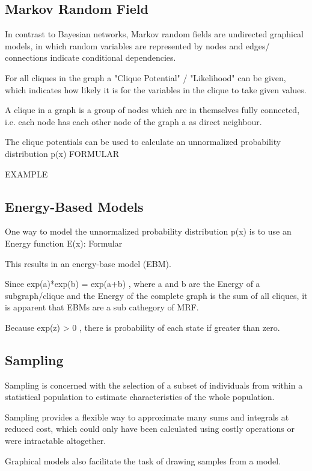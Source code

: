 \subsection{Markov Random Field}

In contrast to Bayesian networks, Markov random fields are undirected graphical models, in which random variables are represented by nodes and edges/ connections indicate conditional dependencies.

For all cliques in the graph a "Clique Potential" / "Likelihood" can be given, which indicates how likely it is for the variables in the clique to take given values.

A clique in a graph is a group of nodes which are in themselves fully connected, i.e. each node has each other node of the graph a as direct neighbour. 

The clique potentials can be used to calculate an unnormalized probability distribution p(x) FORMULAR

EXAMPLE

\subsection{Energy-Based Models}

One way to model the unnormalized probability distribution p(x) is to use an Energy function E(x): Formular

This results in an energy-base model (EBM). 

Since exp(a)*exp(b) = exp(a+b) , where a and b are the Energy of a subgraph/clique and the Energy of the complete graph is the sum of all cliques, it is apparent that EBMs are a sub cathegory of MRF.  

Because exp(z) > 0 , there is probability of each state if greater than zero. 

\subsection{Sampling}

Sampling is concerned with the selection of a subset of individuals from within a statistical population to estimate characteristics of the whole population.

Sampling provides a flexible way to approximate many sums and integrals at reduced cost, which could only have been calculated using costly operations or were intractable altogether.  

Graphical models also facilitate the task of drawing samples from a model.

